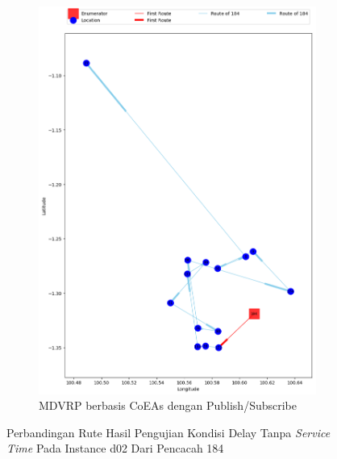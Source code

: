\begin{figure}[H]\ContinuedFloat
	\centering
	\begin{subfigure}[t]{\textwidth}
		\centering
		\includegraphics[width=\textwidth]{Resources/Images/delayed_2/real_m15_n100_delayed_2_184_pubsub_coes}
		\caption{MDVRP berbasis CoEAs dengan Publish/Subscribe}
		\label{fig:real_m15_n100_delayed_2_184_pubsub_coes}
	\end{subfigure}
	\caption{Perbandingan Rute Hasil Pengujian Kondisi Delay Tanpa \textit{Service Time} Pada Instance d02 Dari Pencacah 184}
	\label{fig:real_m15_n100_delayed_2_184_contd}
\end{figure}


